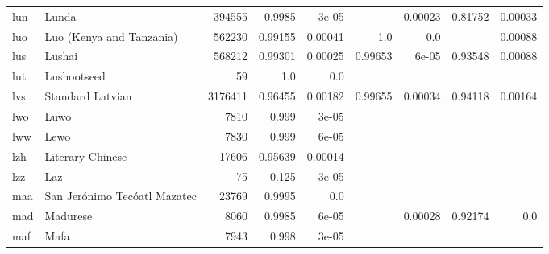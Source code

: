\documentclass[11pt]{article}
\begin{document}
\begin{table*}[h]
{\begin{tabular}{llrrrrrrr}
lun         & Lunda         & 394555         & 0.9985         & 3e-05         &          & 0.00023         & 0.81752         & 0.00033         \\

luo         & Luo (Kenya and Tanzania)         & 562230         & 0.99155         & 0.00041         & 1.0         & 0.0         &          & 0.00088         \\

lus         & Lushai         & 568212         & 0.99301         & 0.00025         & 0.99653         & 6e-05         & 0.93548         & 0.00088         \\

lut         & Lushootseed         & 59         & 1.0         & 0.0         &          &          &          &          \\

lvs         & Standard Latvian         & 3176411         & 0.96455         & 0.00182         & 0.99655         & 0.00034         & 0.94118         & 0.00164         \\

lwo         & Luwo         & 7810         & 0.999         & 3e-05         &          &          &          &          \\

lww         & Lewo         & 7830         & 0.999         & 6e-05         &          &          &          &          \\

lzh         & Literary Chinese         & 17606         & 0.95639         & 0.00014         &          &          &          &          \\

lzz         & Laz         & 75         & 0.125         & 3e-05         &          &          &          &          \\

maa         & San Jerónimo Tecóatl Mazatec         & 23769         & 0.9995         & 0.0         &          &          &          &          \\

mad         & Madurese         & 8060         & 0.9985         & 6e-05         &          & 0.00028         & 0.92174         & 0.0         \\

maf         & Mafa         & 7943         & 0.998         & 3e-05         &          &          &          &          \\


\end{tabular}}
\end{table*}
\end{document}
